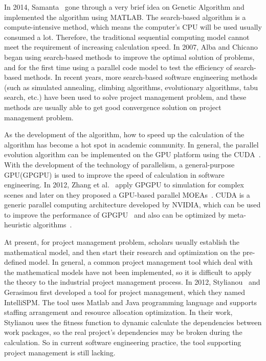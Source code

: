 In 2014, Samanta~\cite{samanta} gone through a very brief idea on Genetic Algorithm and implemented the algorithm using MATLAB.
The search-based algorithm is a compute-intensive method, which means the
computer's CPU will be used usually consumed a lot. Therefore, the traditional
sequential computing model cannot meet the requirement of increasing calculation
speed. In 2007, Alba and Chicano~\cite{pospichal} began using search-based methods to improve the
optimal solution of problems, and for the first time using a parallel code model
to test the efficiency of search-based methods. In recent
years, more search-based software engineering methods (such as simulated
annealing, climbing algorithms, evolutionary algorithms, tabu search, etc.) have
been used to solve project management problem, and these methods are usually
able to get good convergence solution on project management problem.

As the development of the algorithm, how to speed up the calculation of the algorithm
has become a hot spot in academic community.
In general, the parallel evolution algorithm can be implemented on the GPU platform using the CUDA~\cite{vidal}. With the development of the technology of parallelism, a general-purpose GPU(GPGPU) is used 
to improve the speed of calculation in software engineering. In 2012, Zhang et al.~\cite{zhang} apply GPGPU to
simulation for complex scenes and later on they proposed a GPU-based parallel MOEAs~\cite{li}.
CUDA is a generic parallel computing architecture developed by NVIDIA, which can be used to improve the performance of GPGPU~\cite{langdon2} and also can be optimized by meta-heuristic algorithms~\cite{langdon1}.


At present, for project management problem, scholars usually establish the
mathematical model, and then start their research and optimization on the
pre-defined model. In general, a common project management tool which deal with
the mathematical models have not been implemented, so it is difficult to apply
the theory to the industrial project management process. In 2012, Stylianou~\cite{stylianou} and
Gerasimou first developed a tool for project management, which they named
IntelliSPM. The tool uses Matlab and Java programming language and 
supports staffing arrangement and resource allocation optimization. In
their work, Stylianou uses the fitness function to dynamic calculate the
dependencies between work packages, so the real project's dependencies may be
broken during the calculation. So in current software engineering practice, the
tool supporting project management is still lacking.

